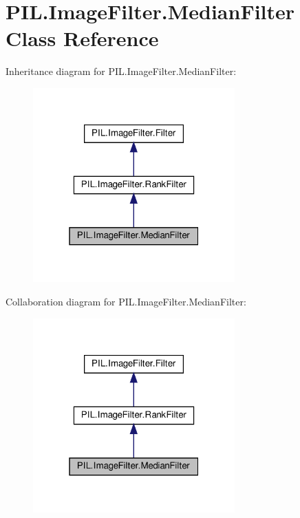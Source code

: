 \hypertarget{classPIL_1_1ImageFilter_1_1MedianFilter}{}\section{P\+I\+L.\+Image\+Filter.\+Median\+Filter Class Reference}
\label{classPIL_1_1ImageFilter_1_1MedianFilter}


Inheritance diagram for P\+I\+L.\+Image\+Filter.\+Median\+Filter\+:
\nopagebreak
\begin{figure}[H]
\begin{center}
\leavevmode
\includegraphics[width=220pt]{classPIL_1_1ImageFilter_1_1MedianFilter__inherit__graph}
\end{center}
\end{figure}


Collaboration diagram for P\+I\+L.\+Image\+Filter.\+Median\+Filter\+:
\nopagebreak
\begin{figure}[H]
\begin{center}
\leavevmode
\includegraphics[width=220pt]{classPIL_1_1ImageFilter_1_1MedianFilter__coll__graph}
\end{center}
\end{figure}
